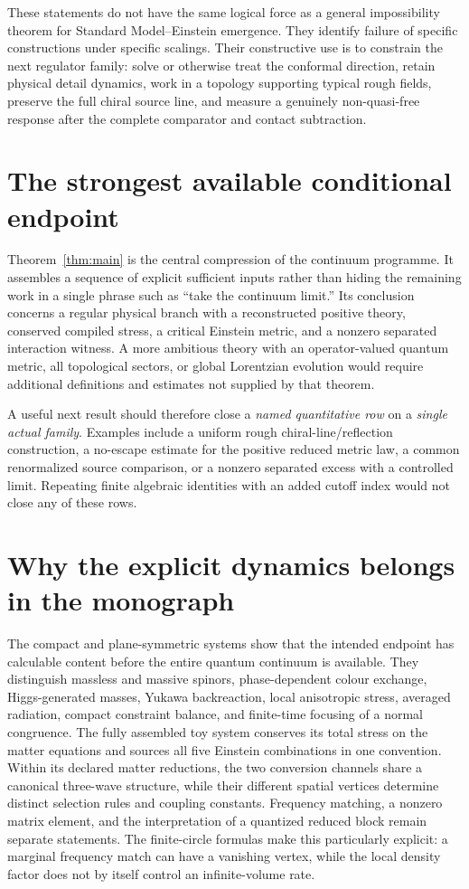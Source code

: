 \documentclass[11pt,a4paper,oneside]{book}
\theoremstyle{plain}
\theoremstyle{definition}
\theoremstyle{remark}
\begin{document}
These statements do not have the same logical force as a general impossibility theorem for Standard Model--Einstein emergence. They identify failure of specific constructions under specific scalings. Their constructive use is to constrain the next regulator family: solve or otherwise treat the conformal direction, retain physical detail dynamics, work in a topology supporting typical rough fields, preserve the full chiral source line, and measure a genuinely non-quasi-free response after the complete comparator and contact subtraction.

\section{The strongest available conditional endpoint}
Theorem~\ref{thm:main} is the central compression of the continuum programme. It assembles a sequence of explicit sufficient inputs rather than hiding the remaining work in a single phrase such as ``take the continuum limit.'' Its conclusion concerns a regular physical branch with a reconstructed positive theory, conserved compiled stress, a critical Einstein metric, and a nonzero separated interaction witness. A more ambitious theory with an operator-valued quantum metric, all topological sectors, or global Lorentzian evolution would require additional definitions and estimates not supplied by that theorem.

A useful next result should therefore close a \emph{named quantitative row} on a \emph{single actual family}. Examples include a uniform rough chiral-line/reflection construction, a no-escape estimate for the positive reduced metric law, a common renormalized source comparison, or a nonzero separated excess with a controlled limit. Repeating finite algebraic identities with an added cutoff index would not close any of these rows.

\section{Why the explicit dynamics belongs in the monograph}
The compact and plane-symmetric systems show that the intended endpoint has calculable content before the entire quantum continuum is available. They distinguish massless and massive spinors, phase-dependent colour exchange, Higgs-generated masses, Yukawa backreaction, local anisotropic stress, averaged radiation, compact constraint balance, and finite-time focusing of a normal congruence. The fully assembled toy system conserves its total stress on the matter equations and sources all five Einstein combinations in one convention. Within its declared matter reductions, the two conversion channels share a canonical three-wave structure, while their different spatial vertices determine distinct selection rules and coupling constants. Frequency matching, a nonzero matrix element, and the interpretation of a quantized reduced block remain separate statements. The finite-circle formulas make this particularly explicit: a marginal frequency match can have a vanishing vertex, while the local density factor does not by itself control an infinite-volume rate.
\end{document}
